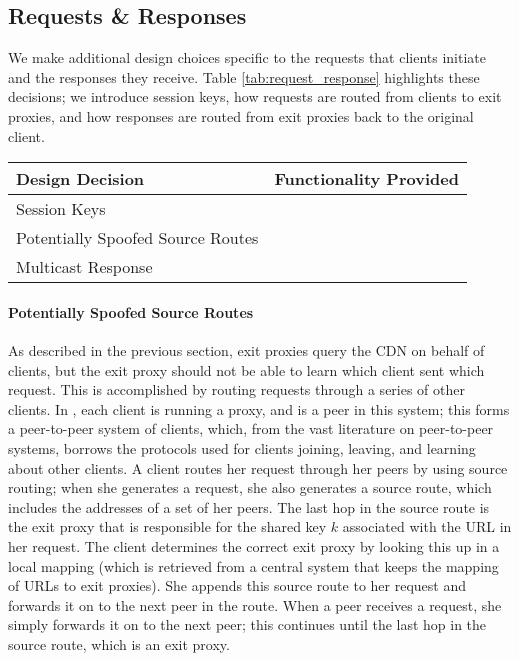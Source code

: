 \subsection{Requests \& Responses}
We make additional design choices specific to the requests that clients initiate and 
the responses they receive.  Table \ref{tab:request_response} highlights these decisions; we 
introduce session keys, how requests are routed from clients to exit proxies, and how responses 
are routed from exit proxies back to the original client.

\begin{table*}[t!]
\centering
\begin{tabular}{| l | l |} 
\hline
 Design Decision & Functionality Provided \\
\hline \hline
 Session Keys & {} \\
\hline
 Potentially Spoofed Source Routes & {} \\
\hline
 Multicast Response & {} \\
\hline
\end{tabular}
\caption{The design decisions associated with content requests and responses, and what these 
decisions provide.}
\label{tab:request_response}
\end{table*}

\paragraph{Potentially Spoofed Source Routes}
As described in the previous section, exit proxies query the CDN on behalf of clients, but the exit proxy 
should not be able to learn which client sent which request.  This is accomplished by routing requests through 
a series of other clients.  In \system{}, each client is running a proxy, and is a peer in this system; this 
forms a peer-to-peer system of clients, which, from the vast literature on peer-to-peer systems, borrows the 
protocols used for clients joining, leaving, and learning about other clients. A client routes her request through 
her peers by using source routing; when she generates a request, she also generates a source route, which includes 
the addresses of a set of her peers.  The last hop in the source route is the exit proxy that is responsible for the 
shared key $k$ associated with the URL in her request.  The client determines the correct exit proxy by looking this 
up in a local mapping (which is retrieved from a central system that keeps the mapping of URLs to exit proxies).  
She appends this source route to her request and forwards it on to the next peer in the route.  When a peer receives 
a request, she simply forwards it on to the next peer; this continues until the last hop in the source route, which 
is an exit proxy. 

